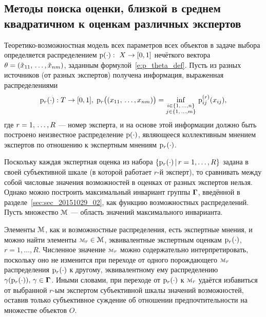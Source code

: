 \subsection{Методы поиска оценки, близкой в среднем квадратичном к оценкам различных экспертов}
\label{easy_collective_matrix_vector}

Теоретико-возможностная модель всех параметров всех объектов в задаче выбора определяется распределением ${\mathrm{p}}(\cdot):\ X\to[0,1]$ нечёткого вектора $\theta = (\tilde x_{11}, \, \ldots, \tilde x_{nm})$, заданным формулой~\ref{e:p_theta_def}. Пусть из разных источников (от разных экспертов) получена информация, выраженная распределениями 
\begin{equation}
\label{pr_theta_def}
	{\mathrm{p}}_r(\cdot): T \rightarrow [0,1],\; {\mathrm{p}}_r \big((x_{11}, \, \ldots, x_{nm})\big) =  \inf_{\substack{i \in \{1,\, \ldots, n\} \\ j \in \{1,\, \ldots, m\}}}\,{\mathrm{p}}^{(r)}_{ij}(x_{ij}), 
\end{equation}
где $r = 1,\, \ldots, R$ --- номер эксперта, и на основе этой информации должно быть построено неизвестное распределение ${\mathrm{p}}(\cdot)$, являющееся коллективным мнением экспертов по отношению к экспертным мнениям ${\mathrm{p}}_r(\cdot)$. 


Поскольку каждая экспертная оценка из набора $\{{\mathrm{p}}_r(\cdot) \,|\, r = 1, \ldots, R\}$ задана в своей субъективной шкале (в которой работает $r$-й эксперт), то сравнивать между собой числовые значения возможностей в оценках от разных экспертов нельзя. Однако можно построить максимальный инвариант группы $\boldsymbol{\Gamma}$, введённой в разделе~\ref{sec:sec_20151029_02}, как функцию возможностных распределений. Пусть множество ${\EuScript{M}}$ --- область значений максимального инварианта. 

Элементы ${\EuScript{M}}$, как и возможностные распределения, есть экспертные мнения, и можно найти элементы $\calm_r \in \calM$, эквивалентные экспертным оценкам ${\mathrm{p}}_r(\cdot)$, $r = 1, \ldots, R$. Численное значение $\calm_r$ можно содержательно интерпретировать, поскольку оно не изменится при переходе от одного порождающего  $\calm_r$ распределения ${\mathrm{p}}_r(\cdot)$ к другому, эквивалентному ему распределению $\gamma({\mathrm{p}}_r(\cdot)),\, \gamma \in \boldsymbol{\Gamma}$. Иными словами, при переходе от ${\mathrm{p}}_r(\cdot)$ к  $\calm_r$ удаётся избавиться от выбранной $r$-ым экспертом субъективной шкалы значений возможностей, оставив только субъективное суждение об отношении предпочтительности на множестве объектов $O$.


